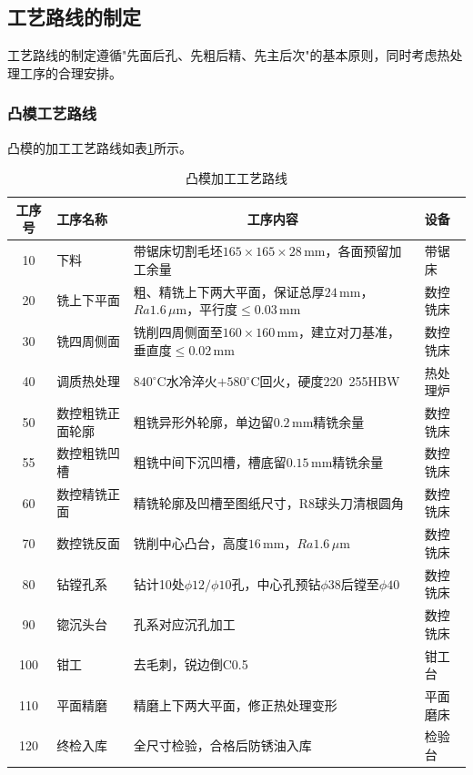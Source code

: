 \documentclass{xautCADreport}
\begin{document}
\subsection{工艺路线的制定}

工艺路线的制定遵循"先面后孔、先粗后精、先主后次"的基本原则，同时考虑热处理工序的合理安排。

\subsubsection{凸模工艺路线}

凸模的加工工艺路线如表\ref{tab:route_punch}所示。

\begin{table}[H]
  \centering
  \caption{凸模加工工艺路线}
  \label{tab:route_punch}
  \small
  \begin{tabular}{clp{7.5cm}l}
    \toprule
    工序号 & 工序名称 & \multicolumn{1}{c}{工序内容} & 设备 \\
    \midrule
    10 & 下料 & 带锯床切割毛坯$165\times165\times28\,\mathrm{mm}$，各面预留加工余量 & 带锯床 \\
    20 & 铣上下平面 & 粗、精铣上下两大平面，保证总厚$24\,\mathrm{mm}$，$Ra1.6\,\mu\mathrm{m}$，平行度$\leq0.03\,\mathrm{mm}$ & 数控铣床 \\
    30 & 铣四周侧面 & 铣削四周侧面至$160\times160\,\mathrm{mm}$，建立对刀基准，垂直度$\leq0.02\,\mathrm{mm}$ & 数控铣床 \\
    40 & 调质热处理 & $840^{\circ}\mathrm{C}$水冷淬火$+580^{\circ}\mathrm{C}$回火，硬度220~255HBW & 热处理炉 \\
    50 & 数控粗铣正面轮廓 & 粗铣异形外轮廓，单边留$0.2\,\mathrm{mm}$精铣余量 & 数控铣床 \\
    55 & 数控粗铣凹槽 & 粗铣中间下沉凹槽，槽底留$0.15\,\mathrm{mm}$精铣余量 & 数控铣床 \\
    60 & 数控精铣正面 & 精铣轮廓及凹槽至图纸尺寸，R8球头刀清根圆角 & 数控铣床 \\
    70 & 数控铣反面 & 铣削中心凸台，高度$16\,\mathrm{mm}$，$Ra1.6\,\mu\mathrm{m}$ & 数控铣床 \\
    80 & 钻镗孔系 & 钻计10处$\phi12/\phi10$孔，中心孔预钻$\phi38$后镗至$\phi40$ & 数控铣床 \\
    90 & 锪沉头台 & 孔系对应沉孔加工 & 数控铣床 \\
    100 & 钳工 & 去毛刺，锐边倒C0.5 & 钳工台 \\
    110 & 平面精磨 & 精磨上下两大平面，修正热处理变形 & 平面磨床 \\
    120 & 终检入库 & 全尺寸检验，合格后防锈油入库 & 检验台 \\
    \bottomrule
  \end{tabular}
\end{table}
\end{document}
